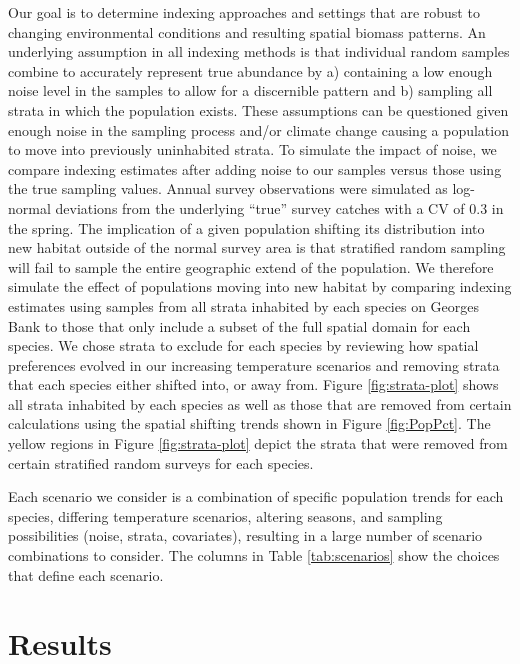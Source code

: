 \documentclass[
  12pt,
]{article}
\begin{document}
Our goal is to determine indexing approaches and settings that are robust to changing environmental conditions and resulting spatial biomass patterns. An underlying assumption in all indexing methods is that individual random samples combine to accurately represent true abundance by a) containing a low enough noise level in the samples to allow for a discernible pattern and b) sampling all strata in which the population exists. These assumptions can be questioned given enough noise in the sampling process and/or climate change causing a population to move into previously uninhabited strata. To simulate the impact of noise, we compare indexing estimates after adding noise to our samples versus those using the true sampling values. Annual survey observations were simulated as log-normal deviations from the underlying ``true'' survey catches with a CV of 0.3 in the spring. The implication of a given population shifting its distribution into new habitat outside of the normal survey area is that stratified random sampling will fail to sample the entire geographic extend of the population. We therefore simulate the effect of populations moving into new habitat by comparing indexing estimates using samples from all strata inhabited by each species on Georges Bank to those that only include a subset of the full spatial domain for each species. We chose strata to exclude for each species by reviewing how spatial preferences evolved in our increasing temperature scenarios and removing strata that each species either shifted into, or away from. Figure \ref{fig:strata-plot} shows all strata inhabited by each species as well as those that are removed from certain calculations using the spatial shifting trends shown in Figure \ref{fig:PopPct}. The yellow regions in Figure \ref{fig:strata-plot} depict the strata that were removed from certain stratified random surveys for each species.

Each scenario we consider is a combination of specific population trends for each species, differing temperature scenarios, altering seasons, and sampling possibilities (noise, strata, covariates), resulting in a large number of scenario combinations to consider. The columns in Table \ref{tab:scenarios} show the choices that define each scenario.

\section{Results}
\end{document}
